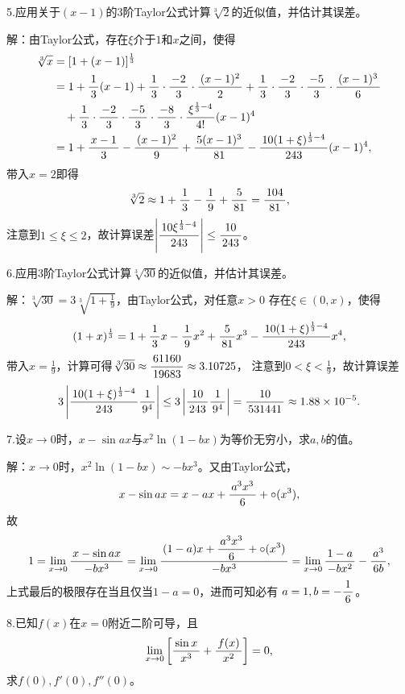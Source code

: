 5.应用关于$(x-1)$的$3$阶Taylor公式计算$\sqrt[3]{2}$的近似值，并估计其误差。

解：由Taylor公式，存在$\xi$介于$1$和$x$之间，使得
\begin{align*}
	\sqrt[3]x&=[1+(x-1)]^{\frac13}\\
	&=1+\df13(x-1)
	+\df13\cdot\df{-2}3\cdot\df{(x-1)^2}2
	+\df13\cdot\df{-2}3\cdot\df{-5}3\cdot\df{(x-1)^3}6\\
	&\quad+\df13\cdot\df{-2}3\cdot\df{-5}3\cdot\df{-8}3
	\cdot\df{\xi^{\frac13-4}}{4!}(x-1)^4\\
	&=1+\df{x-1}3-\df{(x-1)^2}9+\df{5(x-1)^3}{81}
	-\df{10(1+\xi)^{\frac13-4}}{243}(x-1)^4,
\end{align*}
带入$x=2$即得
$$\sqrt[3]2\approx1+\df13-\df19+\df5{81}=\df{104}{81},$$
注意到$1\leq\xi\leq 2$，故计算误差$\left|\df{10\xi^{\frac13-4}}{243}\right|
\leq\df{10}{243}$。\fin

\bigskip

6.应用$3$阶Taylor公式计算$\sqrt[3]{30}$的近似值，并估计其误差。

解：$\sqrt[3]{30}=3\sqrt[3]{1+\frac19}$，由Taylor公式，对任意$x>0$
存在$\xi\in(0,x)$，使得
$$(1+x)^{\frac13}=1+\df13x-\df19x^2+\df5{81}x^3
-\df{10(1+\xi)^{\frac13-4}}{243}x^4,$$
带入$x=\frac19$，计算可得$\sqrt[3]{30}\approx\df{61160}{19683}\approx
3.10725$，
注意到$0<\xi<\frac19$，故计算误差
$$3\left|\df{10(1+\xi)^{\frac13-4}}{243}
\df1{9^4}\right|\leq3\left|\df{10}{243}\df1{9^4}\right|=\df{10}{531441}
\approx 1.88\times10^{-5}.$$
\fin

\bigskip

7.设$x\to 0$时，$x-\sin ax$与$x^2\ln(1-bx)$为等价无穷小，求$a,b$的值。


解：$x\to 0$时，$x^2\ln(1-bx)\sim-bx^3$。又由Taylor公式，
$$x-\sin ax=x-ax+\df{a^3x^3}6+\circ(x^3),$$
故
$$1=\limx0\df{x-\sin ax}{-bx^3}
=\limx0\df{(1-a)x+\df{a^3x^3}6+\circ(x^3)}{-bx^3}
=\limx0\df{1-a}{-bx^2}-\df{a^3}{6b},$$
上式最后的极限存在当且仅当$1-a=0$，进而可知必有
$a=1,b=-\df16$。\fin

\bigskip

8.已知$f(x)$在$x=0$附近二阶可导，且
$$\limx0\left[\df{\sin x}{x^3}+\df{f(x)}{x^2}\right]=0,$$
求$f(0),f'(0),f''(0)$。

